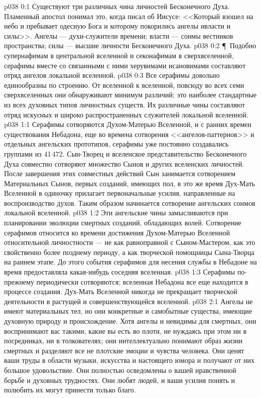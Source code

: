 \vs p038 0:1 Существуют три различных чина личностей Бесконечного Духа. Пламенный апостол понимал это, когда писал об Иисусе: <<Который взошел на небо и пребывает одесную Бога и которому покорились ангелы ивласти и силы>>. Ангелы --- духи\hyp{}служители времени; власти --- сонмы вестников пространства; силы --- высшие личности Бесконечного Духа.
\vs p038 0:2 \P\ Подобно супернафимам в центральной вселенной и секонафимам в сверхвселенной, серафимы вместе со связанными с ними херувимами исановимами составляют отряд ангелов локальной вселенной.
\vs p038 0:3 Все серафимы довольно единообразны по строению. От вселенной к вселенной, повсюду во всех семи сверхвселенных они обнаруживают минимум различий; это наиболее стандартные из всех духовных типов личностных существ. Их различные чины составляют отряд искусных и широко распространенных служителей локальной вселенной.
\vs p038 1:1 Серафимы сотворяются Духом\hyp{}Матерью Вселенной, и с ранних времен существования Небадона, еще во времена сотворения <<ангелов\hyp{}паттернов>> и отдельных ангельских прототипов, серафимы уже постоянно создавались группами из 41\,472. Сын\hyp{}Творец и вселенское представительство Бесконечного Духа совместно сотворяют множество Сынов и других вселенских личностей. После завершения этих совместных действий Сын занимается сотворением Материальных Сынов, первых созданий, имеющих пол, в это же время Дух\hyp{}Мать Вселенной в одиночку прилагает первоначальные усилия, направленные на воспроизводство духов. Таким образом начинается сотворение ангельских сонмов локальной вселенной.
\vs p038 1:2 Эти ангельские чины замысливаются при планировании эволюции смертных созданий, обладающих волей. Сотворение серафимов относится ко времени достижения Духом\hyp{}Матерью Вселенной относительной личностности --- не как равноправной с Сыном\hyp{}Мастером, как это свойственно более позднему периоду, а как творческой помощницы Сына\hyp{}Творца на раннем этапе. До этого события серафимов для несения службы в Небадоне на время предоставляла какая\hyp{}нибудь соседняя вселенная.
\vs p038 1:3 Серафимы по\hyp{}прежнему периодически сотворяются; вселенная Небадона все еще находится в процессе создания. Дух\hyp{}Мать Вселенной никогда не прекращает творческой деятельности в растущей и совершенствующейся вселенной.
\vs p038 2:1 Ангелы не имеют материальных тел, но они конкретные и самобытные существа, имеющие духовную природу и происхождение. Хотя ангелы и невидимы для смертных, они воспринимают вас такими, какие вы есть во плоти, не нуждаясь при этом ни в посредниках, ни в толкователях; они интеллектуально понимают образ жизни смертных и разделяют все не плотские эмоции и чувства человека. Они ценят ваши труды в области музыки, искусства и настоящего юмора и получают от них большое удовольствие. Они полностью осведомлены о вашей нравственной борьбе и духовных трудностях. Они любят людей, и ваши усилия понять и полюбить их могут принести только благо.
